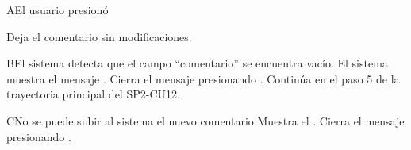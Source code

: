 
\hypertarget{SP2-CU12-A}{}
\begin{UCtrayectoriaA}{A}{El usuario presionó }

  \UCpaso Deja el comentario sin modificaciones.
\end{UCtrayectoriaA}

\begin{UCtrayectoriaA}{B}{El sistema detecta que el campo “comentario” se encuentra vacío.} 
    \hypertarget{SP2-CU12-B}{}
    \UCpaso El sistema muestra el mensaje .
    \UCpaso[\UCactor] Cierra el mensaje presionando .
    \UCpaso Continúa en el paso 5 de la trayectoria principal del SP2-CU12.
\end{UCtrayectoriaA}
\begin{UCtrayectoriaA}{C}{No se puede subir al sistema el nuevo comentario} 
\hypertarget{SP2-CU12-C}{}
  \UCpaso Muestra el .
  \UCpaso[\UCactor] Cierra el mensaje presionando .
\end{UCtrayectoriaA}